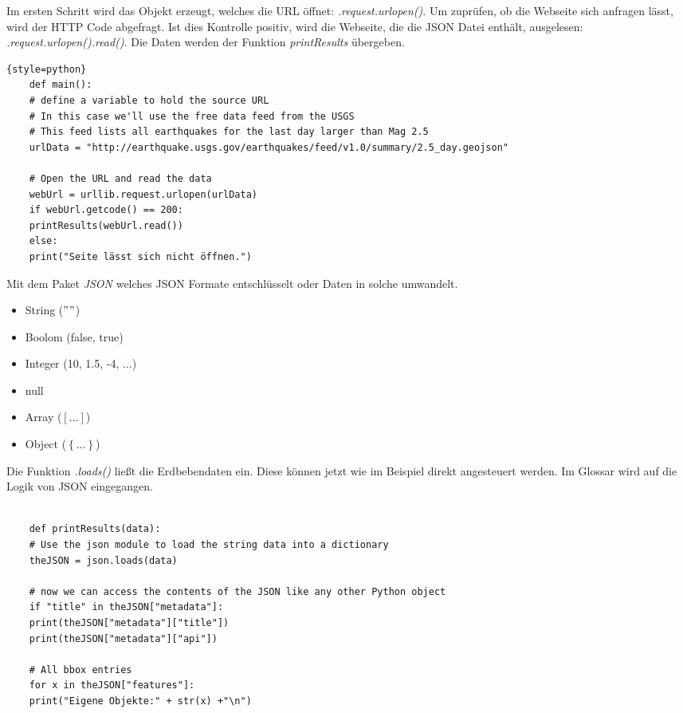 Im ersten Schritt wird das Objekt erzeugt, welches die \gls{URL} öffnet: \textit{.request.urlopen()}. Um zuprüfen, ob die Webseite sich anfragen lässt, wird der \gls{HTTP} Code abgefragt. Ist dies Kontrolle positiv, wird die Webseite, die die \gls{JSON} Datei enthält, ausgelesen: \textit{.request.urlopen().read()}. Die Daten werden der Funktion \textit{printResults} übergeben.
\begin{lstlisting}{style=python}
	def main():
	# define a variable to hold the source URL
	# In this case we'll use the free data feed from the USGS
	# This feed lists all earthquakes for the last day larger than Mag 2.5
	urlData = "http://earthquake.usgs.gov/earthquakes/feed/v1.0/summary/2.5_day.geojson"
	
	# Open the URL and read the data
	webUrl = urllib.request.urlopen(urlData)
	if webUrl.getcode() == 200:
	printResults(webUrl.read())
	else:
	print("Seite lässt sich nicht öffnen.")
\end{lstlisting}

Mit dem Paket \textit{JSON} welches \gls{JSON} Formate entschlüsselt oder Daten in solche umwandelt.
\begin{itemize}
	\item String ($""$)
	\item Boolom (false, true)
	\item Integer (10, 1.5, -4, $\dots$)
	\item null 
	\item Array ($\left[...\right]$)
	\item Object ($\left\lbrace \dots \right\rbrace$)
\end{itemize}  Die Funktion \textit{.loads()} ließt die Erdbebendaten ein. Diese können jetzt wie im Beispiel direkt angesteuert werden. Im Glossar wird auf die Logik von \gls{JSON} eingegangen.
\begin{lstlisting}[style=python]
	
	def printResults(data):
	# Use the json module to load the string data into a dictionary
	theJSON = json.loads(data)
	
	# now we can access the contents of the JSON like any other Python object
	if "title" in theJSON["metadata"]:
	print(theJSON["metadata"]["title"])
	print(theJSON["metadata"]["api"])
	
	# All bbox entries
	for x in theJSON["features"]:
	print("Eigene Objekte:" + str(x) +"\n")
\end{lstlisting}


